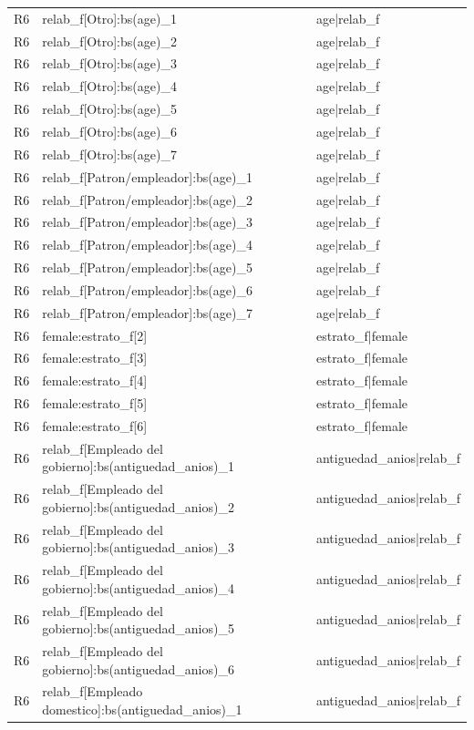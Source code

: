 \begin{longtable}{lll}
R6 & relab\_f[Otro]:bs(age)\_1 & age|relab\_f \\
R6 & relab\_f[Otro]:bs(age)\_2 & age|relab\_f \\
R6 & relab\_f[Otro]:bs(age)\_3 & age|relab\_f \\
R6 & relab\_f[Otro]:bs(age)\_4 & age|relab\_f \\
R6 & relab\_f[Otro]:bs(age)\_5 & age|relab\_f \\
R6 & relab\_f[Otro]:bs(age)\_6 & age|relab\_f \\
R6 & relab\_f[Otro]:bs(age)\_7 & age|relab\_f \\
R6 & relab\_f[Patron/empleador]:bs(age)\_1 & age|relab\_f \\
R6 & relab\_f[Patron/empleador]:bs(age)\_2 & age|relab\_f \\
R6 & relab\_f[Patron/empleador]:bs(age)\_3 & age|relab\_f \\
R6 & relab\_f[Patron/empleador]:bs(age)\_4 & age|relab\_f \\
R6 & relab\_f[Patron/empleador]:bs(age)\_5 & age|relab\_f \\
R6 & relab\_f[Patron/empleador]:bs(age)\_6 & age|relab\_f \\
R6 & relab\_f[Patron/empleador]:bs(age)\_7 & age|relab\_f \\
R6 & female:estrato\_f[2] & estrato\_f|female \\
R6 & female:estrato\_f[3] & estrato\_f|female \\
R6 & female:estrato\_f[4] & estrato\_f|female \\
R6 & female:estrato\_f[5] & estrato\_f|female \\
R6 & female:estrato\_f[6] & estrato\_f|female \\
R6 & relab\_f[Empleado del gobierno]:bs(antiguedad\_anios)\_1 & antiguedad\_anios|relab\_f \\
R6 & relab\_f[Empleado del gobierno]:bs(antiguedad\_anios)\_2 & antiguedad\_anios|relab\_f \\
R6 & relab\_f[Empleado del gobierno]:bs(antiguedad\_anios)\_3 & antiguedad\_anios|relab\_f \\
R6 & relab\_f[Empleado del gobierno]:bs(antiguedad\_anios)\_4 & antiguedad\_anios|relab\_f \\
R6 & relab\_f[Empleado del gobierno]:bs(antiguedad\_anios)\_5 & antiguedad\_anios|relab\_f \\
R6 & relab\_f[Empleado del gobierno]:bs(antiguedad\_anios)\_6 & antiguedad\_anios|relab\_f \\
R6 & relab\_f[Empleado domestico]:bs(antiguedad\_anios)\_1 & antiguedad\_anios|relab\_f \\

\end{longtable}
